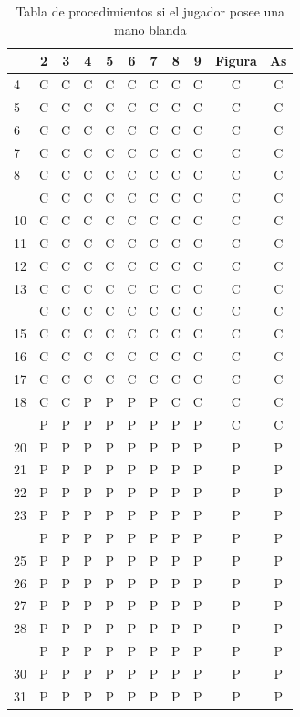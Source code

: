 \documentclass[12pt,a4paper,]{book}
\numberwithin{dummy}{section}
\theoremstyle{ocrenumbox}
\theoremstyle{blacknumex}
\theoremstyle{blacknumbox}
\theoremstyle{ocrenum}
\theoremstyle{ocrenum}
\begin{document}
\begin{longtable}[t]{lcccccccccc}
\caption{\label{tab:unnamed-chunk-7}Tabla de procedimientos si el jugador posee una mano blanda}\\
\toprule
 & 2 & 3 & 4 & 5 & 6 & 7 & 8 & 9 & Figura & As\\
\midrule
4 & C & C & C & C & C & C & C & C & C & C\\
5 & C & C & C & C & C & C & C & C & C & C\\
6 & C & C & C & C & C & C & C & C & C & C\\
7 & C & C & C & C & C & C & C & C & C & C\\
8 & C & C & C & C & C & C & C & C & C & C\\
\addlinespace
9 & C & C & C & C & C & C & C & C & C & C\\
10 & C & C & C & C & C & C & C & C & C & C\\
11 & C & C & C & C & C & C & C & C & C & C\\
12 & C & C & C & C & C & C & C & C & C & C\\
13 & C & C & C & C & C & C & C & C & C & C\\
\addlinespace
14 & C & C & C & C & C & C & C & C & C & C\\
15 & C & C & C & C & C & C & C & C & C & C\\
16 & C & C & C & C & C & C & C & C & C & C\\
17 & C & C & C & C & C & C & C & C & C & C\\
18 & C & C & P & P & P & P & C & C & C & C\\
\addlinespace
19 & P & P & P & P & P & P & P & P & C & C\\
20 & P & P & P & P & P & P & P & P & P & P\\
21 & P & P & P & P & P & P & P & P & P & P\\
22 & P & P & P & P & P & P & P & P & P & P\\
23 & P & P & P & P & P & P & P & P & P & P\\
\addlinespace
24 & P & P & P & P & P & P & P & P & P & P\\
25 & P & P & P & P & P & P & P & P & P & P\\
26 & P & P & P & P & P & P & P & P & P & P\\
27 & P & P & P & P & P & P & P & P & P & P\\
28 & P & P & P & P & P & P & P & P & P & P\\
\addlinespace
29 & P & P & P & P & P & P & P & P & P & P\\
30 & P & P & P & P & P & P & P & P & P & P\\
31 & P & P & P & P & P & P & P & P & P & P\\
\bottomrule
\end{longtable}
\endgroup{}
\end{document}

